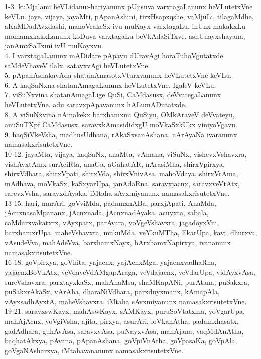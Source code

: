 \documentclass{article}
\begin{document}
1-3. kuMjalanu heVLidanu:-hariyanunx pUjisuva varxtagaLanunx heVLutetxVne keVLu. jaye, vijaye, jayaMti, pApanAshini, tirxHsapxqshe, vaMjuLi, tilagaMdhe, aKaMDadAvxdashi, manoVrakeSx ivu muKayx varxtagaLu. inUnx makakxLu momamxkakxLanunx koDuva varxtagaLu beVkAdaSiTxve. ashUnayxshayana, janAmxSaTxmi ivU muKayxvu.\\
4. I varxtagaLanunx mADidare pApavu dUravAgi horaTuhoVgutatxde. saMdeVhaveV ilalx. satayxvAgi heVLutetxVne.\\
5. pApanAshakavAda shatanAmasotxVtarxvanunx heVLutetxVne keVLu.\\
6. A kaqSaNxna shatanAmagaLanunx heVLutetxVne. IgaleV keVLu.\\
7. viSuNxvina shatanAmagaLige QuSi, CaMdasusx, deVvategaLanunx heVLutetxVne. adu saravxpApavanunx hALumADutatxde.\\
8. A viSuNxvina nAmakekx barxhamxnu QuSiyu, OMkAraveV deVvateyu, anuSuTXpf CaMdasusx. saravxkAmasididxgU moVkaSxkUkx viniyoVgavu.\\
9. haqSiVkeVsha, madhusUdhana, rAkaSxsanAshana, nArAyaNa ivaranunx namasakxrisutetxVne.\\
10-12. jayaMta, vijaya, kaqSaNx, anaMta, vAmana, viSuNx, vishevxVshavxra, vishAvxtAmx surAciRta, anaGa, aGahatAR, nArasiMha, shirxVpirxya, shirxVdhara, shirxVpati, shirxVda, shirxVnivAsa, mahoVdaya, shirxVrAma, mAdhava, moVkaSx, kaSxyarUpa, janAdaRna, saravxjacnx, saravxveVtAtx, sarevxVsha, saravxdAyaka, iMtaha sAvxmiyanunx namasakxrisutetxVne.\\
13-15. hari, murAri, goVviMda, padamxnABa, parxjApati, AnaMda, jAcnxnasaMpananx, jAcnxnada, jAcnxnadAyaka, acuyxta, sabala, caMdarxvakatxrx, vAyxpatx, parAvara, yoVgeVshavxra, jagadoyxVni, barxhamxrUpa, maheVshavxra, mukuMda, veYkuMTha, EkarUpa, kavi, dhurxva, vAsudeVva, mahAdeVva, barxhamxNayx, bArxhamxNapirxya, ivananunx namasakxrisutetxVne.\\
16-18. goVpirxya, goVhita, yajacnx, yajAcnxMga, yajacnxvadhaRna, yajacnxBoVkAtx, veVdaveVdAMgapAraga, veVdajacnx, veVdarUpa, vidAyxvAsa, sureVshavxra, parxtayxkaSx, mahAhaMsa, shaMKapANi, purAtana, puSakxra, puSakxrAkaSx, vArAha, dharaNiVdhara, parxduyxmanx, kAmapAla, vAyxsadhAyxtA, maheVshavxra, iMtaha sAvxmiyanunx namasakxrisutetxVne.\\
19-21. saravxswKayx, mahAswKayx, sAMKayx, puruSoVtatxma, yoVgarUpa, mahAjAcnx, yoVgiVsha, ajita, pirxya, asurAri, loVkanAtha, padamxhasatx, gadAdhara, guhAvAsa, saravxvAsa, puNayxvAsa, mahAjana, vaqMdAnAtha, baqhatAkxya, pAvana, pApanAshana, goVpiVnAtha, goVpasaKa, goVpAla, goVgaNAsharxya, iMtahavananunx namasakxrisutetxVne.\\
\end{document}
